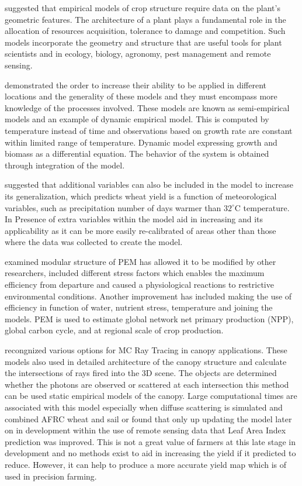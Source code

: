  \citet{Bloomenthal1985} suggested that  empirical models of crop structure require data on the plant's geometric features. The architecture of a plant plays a fundamental role in the allocation of resources acquisition, tolerance to damage and competition. Such models incorporate the geometry and structure that are useful tools for plant scientists and in ecology, biology, agronomy, pest management and remote sensing.

  \citet{Fournier2003} demonstrated the order to increase their ability to be applied in different locations and the generality of these models and they must encompass more knowledge of the processes involved. These models are known as semi-empirical models and an example of dynamic empirical model. This is computed by temperature instead of time and observations based on growth rate are constant within limited range of temperature. Dynamic model expressing growth and biomass as a differential equation. The behavior of the system is obtained through integration of the model. 

 \citet{Waggoner1984} suggested that additional variables can also be included in the model to increase its generalization, which predicts wheat yield is a function of meteorological variables, such as precipitation number of days warmer than $32^{\circ}\text{C}$ temperature. In Presence of extra variables within the model aid in increasing and its applicability as it can be more easily re-calibrated of areas other than those where the data was collected to create the model.

 \citet{Prince1991} examined modular structure of  PEM has allowed it to be modified by other researchers, included different stress factors which enables the maximum efficiency from departure and caused a physiological reactions to restrictive environmental conditions. Another improvement has included making the use of efficiency in function of water, nutrient stress, temperature and joining the models. PEM is used to estimate global network net primary production (NPP), global carbon cycle, and at regional scale of crop production.

  \citet{Disney2000}  recongnized  various options for MC Ray Tracing in canopy applications. These models also used in detailed architecture of the canopy structure and calculate the intersections of rays fired into the 3D scene. The objects are determined whether the photons are observed or scattered at each intersection this method can be used static empirical models of the canopy. Large computational times are associated with this model especially when diffuse scattering is simulated and combined AFRC wheat and sail or found that only up updating the model later on in development within the use of remote sensing data that Leaf Area Index prediction was improved. This is not a great value of farmers at this late stage in development and no methods exist to aid in increasing the yield if it predicted to reduce. However, it can help to produce a more accurate yield map which is of used in precision farming.  
